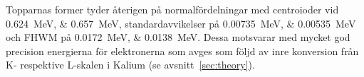 Topparnas former tyder återigen på normalfördelningar med centroioder vid
\qtylist{0.624;0.657}{\MeV}, standardavvikelser på
\qtylist{0.00735;0.00535}{\MeV} och FHWM på \qtylist{0.0172;0.0138}{\MeV}.
Dessa motsvarar med mycket god precision energierna för elektronerna som avges
som följd av inre konversion från K- respektive L-skalen i Kalium (se
avsnitt~\ref{sec:theory}).
